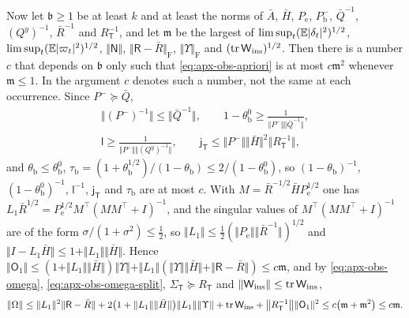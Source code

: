 \begin{remark}
Now let $\mathfrak b\ge1$ be at least $k$ and at least the norms of $\bar A$, $\bar H$, $P_{\mathrm e}$, $P^-_{\mathrm b}$, $\bar Q^{-1}$, $(Q^y)^{-1}$, $\bar R^{-1}$ and $R_{\mathsf T}^{-1}$, and let $\mathfrak m$ be the largest of $\limsup_t(\mathbb{E}\lvert\delta_t\rvert^2)^{1/2}$, $\limsup_t(\mathbb{E}\lvert\varpi_t\rvert^2)^{1/2}$, $\Vert\mathsf N\Vert$, $\Vert\mathsf R-\bar R\Vert_{\mathrm F}$, $\Vert\Upsilon\Vert_{\mathrm F}$ and $(\operatorname{tr}\mathsf W_{\mathrm{ins}})^{1/2}$. Then there is a number $c$ that depends on $\mathfrak b$ only such that \eqref{eq:apx-obs-apriori} is at most $c\mathfrak m^2$ whenever $\mathfrak m\le1$. In the argument $c$ denotes such a number, not the same at each occurrence. Since $P^-\succeq\bar Q$,
\begin{equation*}
\begin{gathered}
\bigl\Vert(P^-)^{-1}\bigr\Vert\le\bigl\Vert\bar Q^{-1}\bigr\Vert,\qquad1-\theta^0_{\mathrm b}\ge\frac{1}{\Vert P^-\Vert\Vert\bar Q^{-1}\Vert},\\
\mathsf l\ge\frac{1}{\Vert P^-\Vert\Vert(Q^y)^{-1}\Vert},\qquad\mathsf j_{\mathsf T}\le\Vert P^-\Vert\Vert\bar H\Vert^2\bigl\Vert R_{\mathsf T}^{-1}\bigr\Vert ,
\end{gathered}
\end{equation*}
and $\theta_{\mathrm b}\le\theta^0_{\mathrm b}$, $\tau_{\mathrm b}=(1+\theta_{\mathrm b}^{1/2})/(1-\theta_{\mathrm b})\le2/(1-\theta^0_{\mathrm b})$, so $(1-\theta_{\mathrm b})^{-1}$, $(1-\theta^0_{\mathrm b})^{-1}$, $\mathsf l^{-1}$, $\mathsf j_{\mathsf T}$ and $\tau_{\mathrm b}$ are at most $c$. With $M=\bar R^{-1/2}\bar HP_{\mathrm e}^{1/2}$ one has $L_1\bar R^{1/2}=P_{\mathrm e}^{1/2}M^\top(MM^\top+I)^{-1}$, and the singular values of $M^\top(MM^\top+I)^{-1}$ are of the form $\sigma/(1+\sigma^2)\le\frac12$, so $\Vert L_1\Vert\le\frac12(\Vert P_{\mathrm e}\Vert\Vert\bar R^{-1}\Vert)^{1/2}$ and $\Vert I-L_1\bar H\Vert\le1+\Vert L_1\Vert\Vert\bar H\Vert$. Hence $\Vert\mathsf O_1\Vert\le(1+\Vert L_1\Vert\Vert\bar H\Vert)\Vert\Upsilon\Vert+\Vert L_1\Vert(\Vert\Upsilon\Vert\Vert\bar H\Vert+\Vert\mathsf R-\bar R\Vert)\le c\mathfrak m$, and by \eqref{eq:apx-obs-omega}, \eqref{eq:apx-obs-omega-split}, $\Sigma_{\mathsf T}\succeq R_{\mathsf T}$ and $\Vert\mathsf W_{\mathrm{ins}}\Vert\le\operatorname{tr}\mathsf W_{\mathrm{ins}}$,
\begin{equation*}
\Vert\Omega\Vert\le\Vert L_1\Vert^2\Vert\mathsf R-\bar R\Vert+2\bigl(1+\Vert L_1\Vert\Vert\bar H\Vert\bigr)\Vert L_1\Vert\Vert\Upsilon\Vert+\tr\mathsf W_{\mathrm{ins}}+\bigl\Vert R_{\mathsf T}^{-1}\bigr\Vert\Vert\mathsf O_1\Vert^2\le c\bigl(\mathfrak m+\mathfrak m^2\bigr)\le c\mathfrak m .

\end{equation*}
\end{remark}
